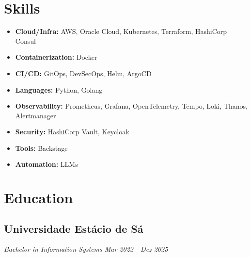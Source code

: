 \documentclass[a4paper,10pt]{article}
\begin{document}

\section{ Skills }
\begin{itemize}
\item \textbf{ Cloud/Infra: } AWS, Oracle Cloud, Kubernetes, Terraform, HashiCorp Consul
\item \textbf{ Containerization: } Docker
\item \textbf{ CI/CD: } GitOps, DevSecOps, Helm, ArgoCD
\item \textbf{ Languages: } Python, Golang
\item \textbf{ Observability: } Prometheus, Grafana, OpenTelemetry, Tempo, Loki, Thanos, Alertmanager
\item \textbf{ Security: } HashiCorp Vault, Keycloak
\item \textbf{ Tools: } Backstage
\item \textbf{ Automation: } LLMs
\end{itemize}


\section{ Education }
\subsection*{\texorpdfstring{
\textbf{ Universidade Estácio de Sá } \hfill 
}{
Universidade Estácio de Sá -- 
}}
\textit{ Bachelor in Information Systems \hfill Mar 2022 - Dez 2025 }
\end{document}
